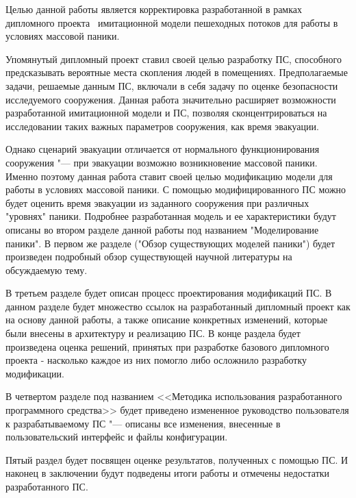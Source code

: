 
\label{sec:intro}

Целью данной работы является корректировка разработанной в рамках дипломного проекта~\cite{my_diploma} имитационной модели пешеходных потоков для работы в условиях массовой паники.

Упомянутый дипломный проект ставил своей целью разработку ПС, способного предсказывать вероятные места скопления людей в помещениях.
Предполагаемые задачи, решаемые данным ПС, включали в себя задачу по оценке безопасности исследуемого сооружения.
Данная работа значительно расширяет возможности разработанной имитационной модели и ПС, позволяя сконцентрироваться на исследовании таких важных параметров сооружения, как время эвакуации.

Однако сценарий эвакуации отличается от нормального функционирования сооружения "--- при эвакуации возможно возникновение массовой паники.
Именно поэтому данная работа ставит своей целью модификацию модели для работы в условиях массовой паники.
С помощью модифицированного ПС можно будет оценить время эвакуации из заданного сооружения при различных "уровнях" паники.
Подробнее разработанная модель и ее характеристики будут описаны во втором разделе данной работы под названием "Моделирование паники".
В первом же разделе ("Обзор существующих моделей паники") будет произведен подробный обзор существующей научной литературы на обсуждаемую тему.

В третьем разделе будет описан процесс проектирования модификаций ПС.
В данном разделе будет множество ссылок на разработанный дипломный проект как на основу данной работы, а также описание конкретных изменений, которые были внесены в архитектуру и реализацию ПС.
В конце раздела будет произведена оценка решений, принятых при разработке базового дипломного проекта - насколько каждое из них помогло либо осложнило разработку модификации.

В четвертом разделе под названием <<Методика использования разработанного программного средства>> будет приведено измененное руководство пользователя к разрабатываемому ПС "--- описаны все изменения, внесенные в пользовательский интерфейс и файлы конфигурации.

Пятый раздел будет посвящен оценке результатов, полученных с помощью ПС.
И наконец в заключении будут подведены итоги работы и отмечены недостатки разработанного ПС.
